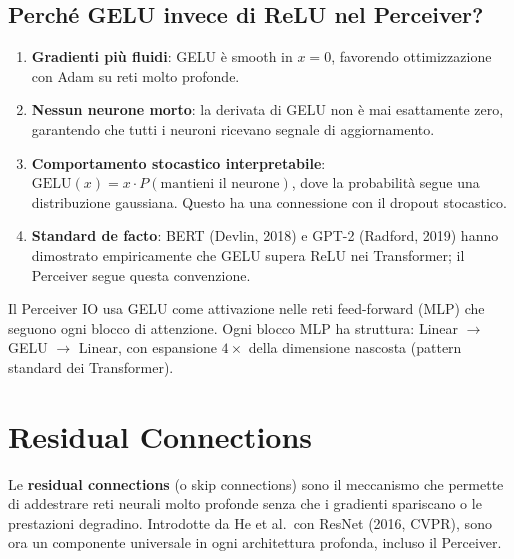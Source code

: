 \documentclass[
  11pt,
]{article}
\begin{document}
\subsection{Perché GELU invece di ReLU nel Perceiver?}

\begin{notabox}[title={\textbf{GELU vs ReLU nelle architetture basate su attenzione}}]
\begin{enumerate}
  \item \textbf{Gradienti più fluidi}: GELU è smooth in $x=0$, favorendo ottimizzazione con Adam su reti molto profonde.
  \item \textbf{Nessun neurone morto}: la derivata di GELU non è mai esattamente zero, garantendo che tutti i neuroni ricevano segnale di aggiornamento.
  \item \textbf{Comportamento stocastico interpretabile}: $\text{GELU}(x) = x \cdot P(\text{mantieni il neurone})$, dove la probabilità segue una distribuzione gaussiana. Questo ha una connessione con il dropout stocastico.
  \item \textbf{Standard de facto}: BERT (Devlin, 2018) e GPT-2 (Radford, 2019) hanno dimostrato empiricamente che GELU supera ReLU nei Transformer; il Perceiver segue questa convenzione.
\end{enumerate}
\end{notabox}

\begin{notabox}[title={\textbf{Collegamento al Perceiver}}]
Il Perceiver IO usa GELU come attivazione nelle reti feed-forward (MLP) che seguono ogni blocco di attenzione. Ogni blocco MLP ha struttura: Linear $\to$ GELU $\to$ Linear, con espansione $4\times$ della dimensione nascosta (pattern standard dei Transformer).
\end{notabox}

\section{Residual Connections}
\label{app:residual}

Le \textbf{residual connections} (o skip connections) sono il meccanismo che permette di addestrare reti neurali molto profonde senza che i gradienti spariscano o le prestazioni degradino. Introdotte da He et al.\ con ResNet (2016, CVPR), sono ora un componente universale in ogni architettura profonda, incluso il Perceiver.
\end{document}

